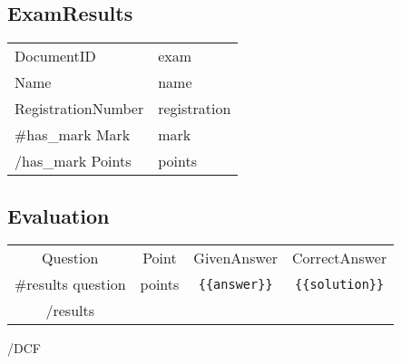 \documentclass[a4paper]{article}{{#DCF}}
\begin{document}
\subsection*{ {{ExamResults}} }

\begin{tabular}{ll}
\hline
{{DocumentID}} & {{exam}}\\
{{Name}} & {{name}} \\
{{RegistrationNumber}} & {{registration}}\\
{{#has_mark}}
{{Mark}} & {{mark}}\\{{/has_mark}}
{{Points}} & {{points}}\\
\hline
\end{tabular}


\subsection*{ {{Evaluation}} }

\begin{tabular}{|c|c|c|c|}
\hline
{{Question}} & {{Point}} & {{GivenAnswer}} & {{CorrectAnswer}} \\{{#results}}
\hline
{{question}} & {{points}} &  \verb|{{answer}}| & \verb|{{solution}}|\\{{/results}}
\hline
\end{tabular}


{{/DCF}}
\end{document}
